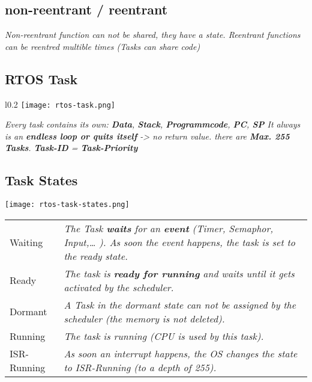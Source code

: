 \subsection{non-reentrant / reentrant}

\textit{
    Non-reentrant function can not be shared, they have a state. \newline
    Reentrant functions can be reentred multible times (Tasks can share code)
}

\subsection{RTOS Task}

\begin{wrapfigure}{l}{0.2\textwidth}
    \centering
    \vspace{-20pt}
    \hspace{-20pt}
    \vspace{-10pt}
    \texttt{[image: rtos-task.png]}
    \hspace{-50pt}
\end{wrapfigure}

\textit{
    Every task contains its own: \newline
    \textbf{Data}, \textbf{Stack}, \textbf{Programmcode},
    \textbf{PC}, \textbf{SP} \newline
    It always is an \textbf{endless loop or quits itself}
    -> no return value.
    there are \textbf{Max. 255 Tasks}. \newline
    \textbf{Task-ID} = \textbf{Task-Priority} \newline
    \newline
}

\subsection{Task States}

\texttt{[image: rtos-task-states.png]}

\begin{tabular}{lp{}}
    Waiting & \textit{
        The Task \textbf{waits} for an \textbf{event} (Timer, Semaphor,
        Input,… ). As soon the event happens, the task is set
        to the ready state.
    } \\
    Ready   & \textit{
        The task is \textbf{ready for running} and waits until it gets
        activated by the scheduler.
    } \\
    Dormant & \textit{
        A Task in the dormant state can not be assigned by
        the scheduler (the memory is not deleted).
    } \\
    Running & \textit{
        The task is running (CPU is used by this task).
    } \\
    ISR-Running & \textit{
        As soon an interrupt happens, the OS changes the
        state to ISR-Running (to a depth of 255).
    }
\end{tabular}

